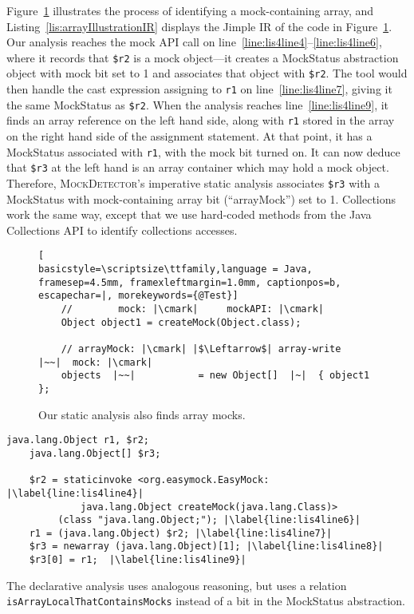 Figure~\ref{fig:arrayMockIllustration} illustrates the process of identifying a mock-containing array, and Listing~\ref{lis:arrayIllustrationIR} displays the Jimple IR of the code in Figure~\ref{fig:arrayMockIllustration}. Our analysis reaches the mock API call on line~\ref{line:lis4line4}--\ref{line:lis4line6}, where it records that \texttt{\$r2} is a mock object---it creates a MockStatus abstraction object with mock bit set to 1 and associates that object with \texttt{\$r2}. The tool would then handle the cast expression assigning to \texttt{r1} on line~\ref{line:lis4line7}, giving it the same MockStatus as \texttt{\$r2}. When the analysis reaches line~\ref{line:lis4line9}, it finds an array reference on the left hand side, along with \texttt{r1} stored in the array on the right hand side of the assignment statement. At that point, it has a MockStatus associated with \texttt{r1}, with the mock bit turned on. It can now deduce that \texttt{\$r3} at the left hand is an array container which may hold a mock object. Therefore, \textsc{MockDetector}'s imperative static analysis associates \texttt{\$r3} with a MockStatus with mock-containing array bit (``arrayMock'') set to 1. Collections work the same way, except that we use hard-coded methods from the Java Collections API to identify collections accesses.


\begin{figure}[h]
\begin{lstlisting}[
basicstyle=\scriptsize\ttfamily,language = Java, framesep=4.5mm, framexleftmargin=1.0mm, captionpos=b, escapechar=|, morekeywords={@Test}]
	//        mock: |\cmark|     mockAPI: |\cmark|
	Object object1 = createMock(Object.class);
	
	// arrayMock: |\cmark| |$\Leftarrow$| array-write    |~~|  mock: |\cmark|
	objects  |~~|           = new Object[]  |~|  { object1 };
\end{lstlisting}
    
    \caption{Our static analysis also finds array mocks.}
    \label{fig:arrayMockIllustration}
    
\end{figure}

\begin{lstlisting}[basicstyle=\ttfamily, caption={Jimple Intermediate Representation for the array in Figure~\ref{fig:arrayMockIllustration}.},
basicstyle=\scriptsize\ttfamily, framesep=4.5mm, framexleftmargin=1.0mm, captionpos=b, label=lis:arrayIllustrationIR, escapechar=|, morekeywords={@Test, specialinvoke, virtualinvoke, staticinvoke, newarray}]
	java.lang.Object r1, $r2;
	java.lang.Object[] $r3;
	
	$r2 = staticinvoke <org.easymock.EasyMock: |\label{line:lis4line4}|
	         java.lang.Object createMock(java.lang.Class)>
	     (class "java.lang.Object;"); |\label{line:lis4line6}|
	r1 = (java.lang.Object) $r2; |\label{line:lis4line7}|
	$r3 = newarray (java.lang.Object)[1]; |\label{line:lis4line8}|
	$r3[0] = r1;  |\label{line:lis4line9}|
\end{lstlisting}


The declarative analysis uses analogous reasoning, but uses a relation \texttt{isArrayLocalThatContainsMocks} instead of a bit in the MockStatus abstraction.
